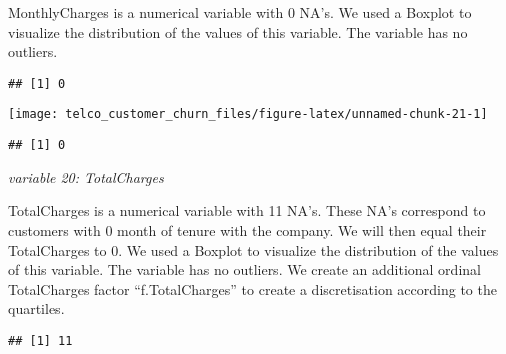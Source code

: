 \documentclass[
  a4paper]{article}
\newenvironment{Shaded}{\begin{snugshade}}{\end{snugshade}}
\newcommand{\AttributeTok}[1]{\textcolor[rgb]{0.13,0.29,0.53}{#1}}
\newcommand{\CommentTok}[1]{\textcolor[rgb]{0.56,0.35,0.01}{\textit{#1}}}
\newcommand{\ConstantTok}[1]{\textcolor[rgb]{0.56,0.35,0.01}{#1}}
\newcommand{\FunctionTok}[1]{\textcolor[rgb]{0.13,0.29,0.53}{\textbf{#1}}}
\newcommand{\NormalTok}[1]{#1}
\newcommand{\SpecialCharTok}[1]{\textcolor[rgb]{0.81,0.36,0.00}{\textbf{#1}}}
\begin{document}
MonthlyCharges is a numerical variable with 0 NA's. We used a Boxplot to
visualize the distribution of the values of this variable. The variable
has no outliers.

\begin{Shaded}
\end{Shaded}

\begin{verbatim}
## [1] 0
\end{verbatim}

\begin{Shaded}
\end{Shaded}

\texttt{[image: telco\_customer\_churn\_files/figure-latex/unnamed-chunk-21-1]}

\begin{verbatim}
## [1] 0
\end{verbatim}

\emph{variable 20: TotalCharges}

TotalCharges is a numerical variable with 11 NA's. These NA's correspond
to customers with 0 month of tenure with the company. We will then equal
their TotalCharges to 0. We used a Boxplot to visualize the distribution
of the values of this variable. The variable has no outliers. We create
an additional ordinal TotalCharges factor ``f.TotalCharges'' to create a
discretisation according to the quartiles.

\begin{Shaded}
\end{Shaded}

\begin{verbatim}
## [1] 11
\end{verbatim}
\end{document}
